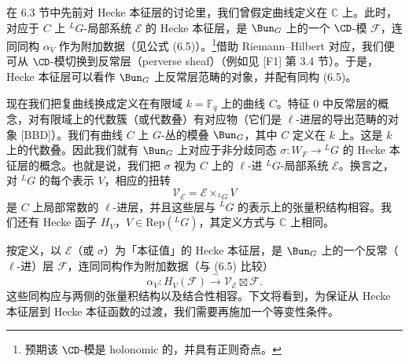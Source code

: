 在 6.3 节中先前对 Hecke 本征层的讨论里，我们曾假定曲线定义在 $\mathbb{C}$ 上。此时，对应于 $C$ 上 ${}^{L}G$-局部系统 $\mathcal{E}$ 的 Hecke 本征层，是 $\Bun_G$ 上的一个 $\CD$-模 $\mathcal{F}$，连同同构 $\alpha_V$ 作为附加数据（见公式 (6.5)）。\footnote{预期该 $\CD$-模是 holonomic 的，并具有正则奇点。}借助 Riemann--Hilbert 对应，我们便可从 $\CD$-模切换到反常层（perverse sheaf）（例如见 [F1] 第 3.4 节）。于是，Hecke 本征层可以看作 $\Bun_G$ 上反常层范畴的对象，并配有同构 (6.5)。


现在我们把复曲线换成定义在有限域 $k = \mathbb{F}_q$ 上的曲线 $C$。特征 $0$ 中反常层的概念，对有限域上的代数簇（或代数叠）有对应物（它们是 $\ell$-进层的导出范畴的对象 [BBD]）。我们有曲线 $C$ 上 $G$-丛的模叠 $\Bun_G$，其中 $C$ 定义在 $k$ 上。这是 $k$ 上的代数叠。因此我们就有 $\Bun_G$ 上对应于非分歧同态 $\sigma : W_F \to {}^{L}G$ 的 Hecke 本征层的概念。也就是说，我们把 $\sigma$ 视为 $C$ 上的 $\ell$-进 ${}^{L}G$-局部系统 $\mathcal{E}$。换言之，对 ${}^{L}G$ 的每个表示 $V$，相应的扭转
\[
\mathcal{V}_{\mathcal{E}} = \mathcal{E} \times_{{}^{L}G} V
\]
是 $C$ 上局部常数的 $\ell$-进层，并且这些层与 ${}^{L}G$ 的表示上的张量积结构相容。我们还有 Hecke 函子 $H_V$，$V\in \mathrm{Rep}({}^{L}G)$，其定义方式与 $\mathbb{C}$ 上相同。

按定义，以 $\mathcal{E}$（或 $\sigma$）为「本征值」的 Hecke 本征层，是 $\Bun_G$ 上的一个反常（$\ell$-进）层 $\mathcal{F}$，连同同构作为附加数据（与 (6.5) 比较）
\begin{equation}\tag{8.1}
\alpha_V : H_V(\mathcal{F}) \xrightarrow{\ \sim\ } \mathcal{V}_{\mathcal{E}} \boxtimes \mathcal{F}.
\end{equation}
这些同构应与两侧的张量积结构以及结合性相容。下文将看到，为保证从 Hecke 本征层到 Hecke 本征函数的过渡，我们需要再施加一个等变性条件。

